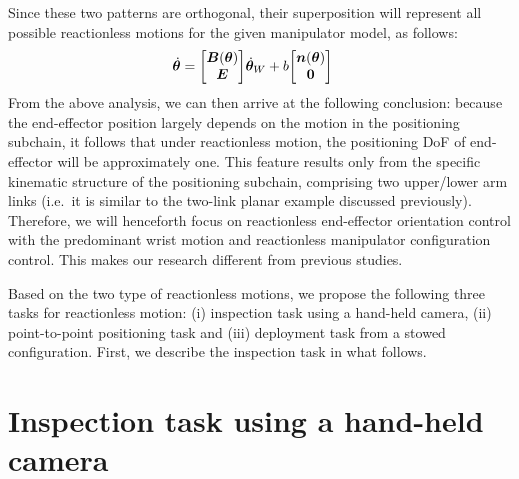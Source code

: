 Since these two patterns are  orthogonal, their superposition will represent all possible reactionless
motions for the given manipulator model, as follows:
%
\begin{align}
  {\dot{\bm{\theta}}} &= {\begin{bmatrix} \bm{B}({\bm{\theta}}) \\ \bm{E} \end{bmatrix}}{\dot{\bm{\theta}}}_{W} + b {\begin{bmatrix} \bm{n}({\bm{\theta}}) \\ \bm{0} \end{bmatrix}}
\end{align}
%
From the above analysis,
we can then arrive at the following conclusion:
because the end-effector position largely depends on the motion in the positioning subchain,
it follows that under reactionless motion, the positioning DoF of end-effector will be 
approximately one. This feature results only from the specific kinematic structure of the
positioning subchain, comprising two upper/lower arm links (i.e.\ it is similar to the 
two-link planar example discussed previously).
Therefore, we will henceforth focus on reactionless end-effector orientation control
with the predominant wrist motion and reactionless manipulator configuration control.
This makes our research different from previous studies.

Based on the two type of reactionless motions,
we propose the following three tasks for reactionless motion:
(i) inspection task using a hand-held camera,
(ii) point-to-point positioning task and
(iii) deployment task from a stowed configuration.
First, we describe the inspection task in what follows.

\section{Inspection task using a hand-held camera}
\label{sec:INSPECTION}

